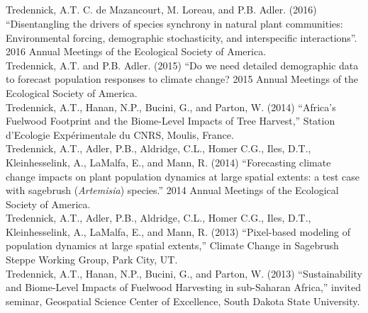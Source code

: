 \documentclass[margin,line]{resume}
\begin{document}
\begin{resume}
     \section{\textmd{\textsf{\color{MidnightBlue}{Presentations}}}}
        Tredennick, A.T. C. de Mazancourt, M. Loreau, and P.B. Adler. (2016) ``Disentangling the drivers of species synchrony in natural plant communities: Environmental forcing, demographic stochasticity, and interspecific interactions''. 2016 Annual Meetings of the Ecological Society of America.\vspace{-6mm}\\%
        
    Tredennick, A.T. and P.B. Adler. (2015) ``Do we need detailed demographic data to forecast population responses to climate change? 2015 Annual Meetings of the Ecological Society of America.\vspace{-6mm}\\%
    
    Tredennick, A.T., Hanan, N.P., Bucini, G., and Parton, W. (2014) ``Africa's Fuelwood Footprint and the Biome-Level Impacts of Tree Harvest,'' Station d'Ecologie Exp\'{e}rimentale du CNRS, Moulis, France. \vspace{-6mm}\\%
    
    Tredennick, A.T., Adler, P.B., Aldridge, C.L., Homer C.G., Iles, D.T., Kleinhesselink, A., LaMalfa, E., and Mann, R. (2014) ``Forecasting climate change impacts on plant population dynamics at large spatial extents: a test case with sagebrush (\emph{Artemisia}) species.'' 2014 Annual Meetings of the Ecological Society of America.\vspace{-6mm}\\%
    
    Tredennick, A.T., Adler, P.B., Aldridge, C.L., Homer C.G., Iles, D.T., Kleinhesselink, A., LaMalfa, E., and Mann, R. (2013) ``Pixel-based modeling of population dynamics at large spatial extents,'' Climate Change in Sagebrush Steppe Working Group, Park City, UT. \vspace{-6mm}\\%
    

    Tredennick, A.T., Hanan, N.P., Bucini, G., and Parton, W. (2013) ``Sustainability and Biome-Level Impacts of Fuelwood Harvesting in sub-Saharan Africa,'' invited seminar, Geospatial Science Center of Excellence, South Dakota State University. \vspace{-6mm}\\%
    

\end{resume}
\end{document}

